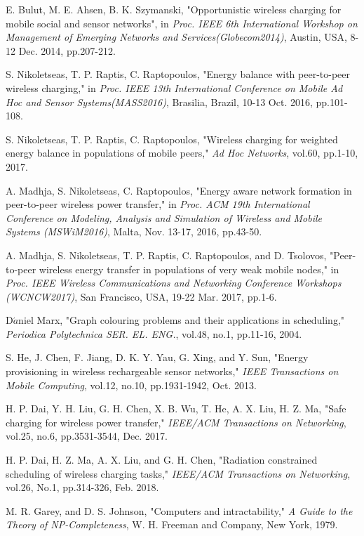 \documentclass[journal,10pt]{IEEEtran}
\begin{document}
\begin{thebibliography}{11}
E. Bulut, M. E. Ahsen, B. K. Szymanski, "Opportunistic wireless charging for mobile social and sensor networks", in \textit{Proc. IEEE 6th International Workshop on Management of Emerging Networks and Services(Globecom2014)}, Austin, USA, 8-12 Dec. 2014, pp.207-212.

S. Nikoletseas, T. P. Raptis, C. Raptopoulos, "Energy balance with peer-to-peer wireless charging," in \textit{Proc. IEEE 13th International Conference on Mobile Ad Hoc and Sensor Systems(MASS2016)}, Brasilia, Brazil, 10-13 Oct. 2016, pp.101-108.

S. Nikoletseas, T. P. Raptis, C. Raptopoulos, "Wireless charging for weighted energy balance in populations of mobile peers," \textit{Ad Hoc Networks}, vol.60, pp.1-10, 2017.

A. Madhja, S. Nikoletseas, C. Raptopoulos, "Energy aware network formation in peer-to-peer wireless power transfer," in \textit{Proc. ACM 19th International Conference on Modeling, Analysis and Simulation of Wireless and Mobile Systems (MSWiM2016)}, Malta, Nov. 13-17, 2016, pp.43-50.

A. Madhja, S. Nikoletseas, T. P. Raptis, C. Raptopoulos, and D. Tsolovos, "Peer-to-peer wireless energy transfer in populations of very weak mobile nodes," in \textit{Proc. IEEE Wireless Communications and Networking Conference Workshops (WCNCW2017)}, San Francisco, USA, 19-22 Mar. 2017, pp.1-6.

D$\acute{a}$niel Marx, "Graph colouring problems and their applications in scheduling," \textit{Periodica Polytechnica SER. EL. ENG.}, vol.48, no.1, pp.11-16, 2004.

S. He, J. Chen, F. Jiang, D. K. Y. Yau, G. Xing, and Y. Sun, "Energy provisioning in wireless rechargeable sensor networks," \textit{IEEE Transactions on Mobile Computing}, vol.12, no.10, pp.1931-1942, Oct. 2013.

H. P. Dai, Y. H. Liu, G. H. Chen, X. B. Wu, T. He, A. X. Liu, H. Z. Ma, "Safe charging for wireless power transfer," \textit{IEEE/ACM Transactions on Networking}, vol.25, no.6, pp.3531-3544, Dec. 2017.

H. P. Dai, H. Z. Ma, A. X. Liu, and G. H. Chen, "Radiation constrained scheduling of wireless charging tasks," \textit{IEEE/ACM Transactions on Networking}, vol.26, No.1, pp.314-326, Feb. 2018.

M. R. Garey, and D. S. Johnson, "Computers and intractability," \textit{A Guide to the Theory of NP-Completeness}, W. H. Freeman and Company, New York, 1979.


\end{thebibliography}
\end{document}
